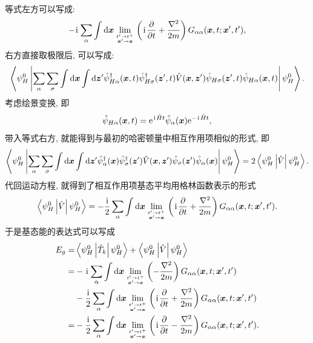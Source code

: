 等式左方可以写成:
\begin{equation}
    -\hspace{0.1em}\mathrm{i}\hspace{0.1em}\sum_\alpha\int\mathrm{d}\boldsymbol{x}\lim_{t'\to t^+\atop\boldsymbol{x}'\to \boldsymbol{x}}\left( \hspace{0.1em}\mathrm{i}\hspace{0.1em}\frac{\partial}{\partial t}+\frac{\nabla^2}{2m} \right) G_{\alpha\alpha}(\boldsymbol{x},t;\boldsymbol{x}',t'),
\end{equation}
右方直接取极限后, 可以写成:
\begin{equation}
    \left\langle \psi_H^0\left|\sum_\alpha\sum_\sigma\int\mathrm{d}\boldsymbol{x}\int\mathrm{d}\boldsymbol{z}'\hat{\psi}_{H\alpha}^\dagger(\boldsymbol{x},t)\hat\psi_{H\sigma}^\dagger(\boldsymbol{z}',t)\hat{V}(\boldsymbol{x},\boldsymbol{z}')\hat{\psi}_{H\sigma}(\boldsymbol{z}',t)\hat{\psi}_{H\alpha}(\boldsymbol{x},t)\right|\psi_H^0 \right\rangle.
\end{equation}
考虑绘景变换, 即
\begin{equation}
    \hat\psi_{H\alpha}(\boldsymbol{x},t)=\mathrm{e}^{\hspace{0.1em}\mathrm{i}\hspace{0.1em}\hat{H}t}\hat\psi_\alpha(\boldsymbol{x})\mathrm{e}^{-\hspace{0.1em}\mathrm{i}\hspace{0.1em}\hat{H}t},
\end{equation}
带入等式右方, 就能得到与最初的哈密顿量中相互作用项相似的形式, 即
\begin{equation}
    \left\langle \psi_H^0\left|\sum_\alpha\sum_\sigma\int\mathrm{d}\boldsymbol{x}\int\mathrm{d}\boldsymbol{z}'\hat{\psi}_\alpha^\dagger(\boldsymbol{x})\hat\psi_\sigma^\dagger(\boldsymbol{z}')\hat{V}(\boldsymbol{x},\boldsymbol{z}')\hat{\psi}_\sigma(\boldsymbol{z}')\hat\psi_\alpha(\boldsymbol{x})\right|\psi_H^0\right\rangle=2\left\langle\psi_H^0\left|\hat{V}\right|\psi_H^0\right\rangle.
\end{equation}
代回运动方程, 就得到了相互作用项基态平均用格林函数表示的形式
\begin{equation}
    \left\langle \psi_H^0\left|\hat{V}\right|\psi_H^0 \right\rangle=-\frac{\hspace{0.1em}\mathrm{i}\hspace{0.1em}}{2}\sum_{\alpha}\int\mathrm{d} \boldsymbol{x}\lim_{t'\to t^+\atop\boldsymbol{x}'\to \boldsymbol{x}}\left( \hspace{0.1em}\mathrm{i}\hspace{0.1em}\frac{\partial}{\partial t}+\frac{\nabla^2}{2m} \right) G_{\alpha\alpha}(\boldsymbol{x},t;\boldsymbol{x}',t').
\end{equation}
于是基态能的表达式可以写成
\begin{align}
    E_g=&\left\langle \psi_H^0\left|\hat{T}_k\right|\psi_H^0 \right\rangle+\left\langle\psi_H^0\left|\hat{V}\right|\psi_H^0\right\rangle\nonumber\\
    =&-\hspace{0.1em}\mathrm{i}\hspace{0.1em}\sum_\alpha\int\mathrm{d}\boldsymbol{x}\lim_{t'\to t^+\atop\boldsymbol{x}'\to \boldsymbol{x}}\left( -\frac{\nabla^2}{2m} \right) G_{\alpha\alpha}(\boldsymbol{x},t;\boldsymbol{x}',t')\nonumber\\
    &-\frac{\hspace{0.1em}\mathrm{i}\hspace{0.1em}}{2}\sum_\alpha\int\mathrm{d}\boldsymbol{x}\lim_{t'\to t^+\atop\boldsymbol{x}'\to \boldsymbol{x}}\left( \hspace{0.1em}\mathrm{i}\hspace{0.1em}\frac{\partial}{\partial t}+\frac{\nabla^2}{2m} \right) G_{\alpha\alpha}(\boldsymbol{x},t;\boldsymbol{x}',t')\nonumber\\
    =&-\frac{\hspace{0.1em}\mathrm{i}\hspace{0.1em}}{2}\sum_\alpha \int\mathrm{d}\boldsymbol{x}\lim_{t'\to t^+\atop\boldsymbol{x}'\to \boldsymbol{x}}\left( \hspace{0.1em}\mathrm{i}\hspace{0.1em}\frac{\partial}{\partial t}-\frac{\nabla^2}{2m} \right) G_{\alpha\alpha}(\boldsymbol{x},t;\boldsymbol{x}',t').
\end{align}

